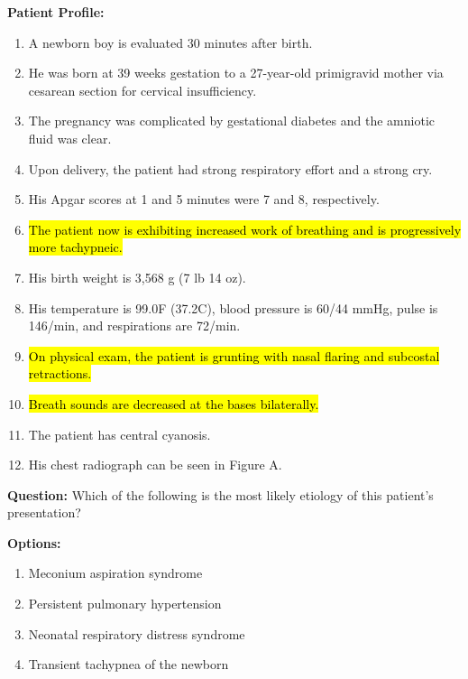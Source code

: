 \documentclass[11pt]{article}
\newcommand{\traineeHigh}[1]{\hl{#1}}
\begin{document}
\begin{tcolorbox}[colback=blue!3!white, colframe=blue!50!white,
                  title=Example of QA Data (from Medbullets QA ID0102), left=10mm, breakable]
\small

\textbf{Patient Profile:}
\begin{enumerate}
  \item A newborn boy is evaluated 30 minutes after birth.
  \item He was born at 39 weeks gestation to a 27-year-old primigravid mother via cesarean section for cervical insufficiency.
  \item The pregnancy was complicated by gestational diabetes and the amniotic fluid was clear.
  \item Upon delivery, the patient had strong respiratory effort and a strong cry.
  \item His Apgar scores at 1 and 5 minutes were 7 and 8, respectively.
  \item \traineeHigh{The patient now is exhibiting increased work of breathing and is progressively more tachypneic.}
  \item His birth weight is 3{,}568 g (7 lb 14 oz).
  \item His temperature is 99.0\textdegree F (37.2\textdegree C), blood pressure is 60/44 mmHg, pulse is 146/min, and respirations are 72/min.
  \item \traineeHigh{On physical exam, the patient is grunting with nasal flaring and subcostal retractions.}
  \item \traineeHigh{Breath sounds are decreased at the bases bilaterally.}
  \item The patient has central cyanosis.
  \item His chest radiograph can be seen in Figure A.
\end{enumerate}

\bigskip
\textbf{Question:} Which of the following is the most likely etiology of this patient's presentation?

\bigskip
\textbf{Options:}
\begin{enumerate}[label=\Alph*.]
  \item Meconium aspiration syndrome
  \item Persistent pulmonary hypertension
  \item Neonatal respiratory distress syndrome
  \item Transient tachypnea of the newborn
\end{enumerate}


\end{tcolorbox}
\end{document}
